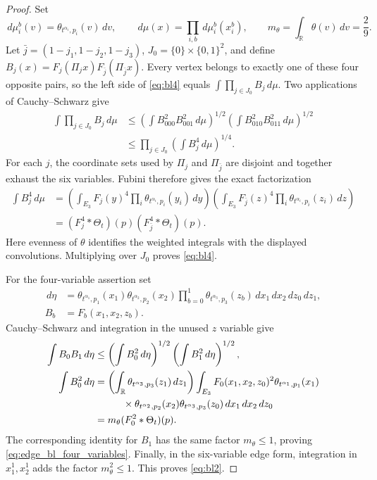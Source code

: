 \documentclass[12pt,reqno]{amsart}
\theoremstyle{plain}
\theoremstyle{definition}
\theoremstyle{remark}
\numberwithin{equation}{section}
\newcommand{\R}{\mathbb R}
\newcommand{\dd}{\,d}
\begin{document}
\begin{proof}
Set
\[
 \dd\mu_i^b(v)=\theta_{t^{\alpha_i},p_i}(v)\dd v,
 \qquad \dd\mu(x)=\prod_{i,b}\dd\mu_i^b(x_i^b),\qquad
 m_\theta=\int_\R\theta(v)\dd v=\frac29.
\]
Let $\bar j=(1-j_1,1-j_2,1-j_3)$, $J_0=\{0\}\times\{0,1\}^2$,
and define $B_j(x)=F_j(\Pi_jx)F_{\bar j}(\Pi_{\bar j}x)$.
Every vertex belongs to exactly one of these four opposite pairs, so
the left side of \eqref{eq:bl4} equals $\int\prod_{j\in J_0}B_j\dd\mu$.
Two applications of Cauchy--Schwarz give
\begin{align*}
 \int\prod_{j\in J_0}B_j\dd\mu
 &\le\left(\int B_{000}^2B_{001}^2\dd\mu\right)^{1/2}
       \left(\int B_{010}^2B_{011}^2\dd\mu\right)^{1/2}\\
 &\le\prod_{j\in J_0}\left(\int B_j^4\dd\mu\right)^{1/4}.
\end{align*}
For each $j$, the coordinate sets used by $\Pi_j$ and $\Pi_{\bar j}$
are disjoint and together exhaust the six variables. Fubini therefore
gives the exact factorization
\begin{align*}
 \int B_j^4\dd\mu
 &=\left(\int_{E_3}F_j(y)^4
                    \prod_i\theta_{t^{\alpha_i},p_i}(y_i)\dd y\right)
   \left(\int_{E_3}F_{\bar j}(z)^4
                    \prod_i\theta_{t^{\alpha_i},p_i}(z_i)\dd z\right)\\
 &=(F_j^4*\Theta_t)(p)(F_{\bar j}^4*\Theta_t)(p).
\end{align*}
Here evenness of $\theta$ identifies the weighted integrals with
the displayed convolutions. Multiplying over $J_0$ proves
\eqref{eq:bl4}.

For the four-variable assertion set
\begin{align*}
 \dd\eta&=\theta_{t^{\alpha_1},p_1}(x_1)
          \theta_{t^{\alpha_2},p_2}(x_2)
          \prod_{b=0}^1\theta_{t^{\alpha_3},p_3}(z_b)
          \dd x_1\dd x_2\dd z_0\dd z_1,\\
 B_b&=F_b(x_1,x_2,z_b).
\end{align*}
Cauchy--Schwarz and integration in the unused $z$ variable give
\begin{align*}
 \int B_0B_1\dd\eta
 &\le\left(\int B_0^2\dd\eta\right)^{1/2}
       \left(\int B_1^2\dd\eta\right)^{1/2},\\
 \int B_0^2\dd\eta
 &=\left(\int_\R\theta_{t^{\alpha_3},p_3}(z_1)\dd z_1\right)
   \int_{E_3}F_0(x_1,x_2,z_0)^2
       \theta_{t^{\alpha_1},p_1}(x_1)\\
 &\hspace{10mm}\times
       \theta_{t^{\alpha_2},p_2}(x_2)
       \theta_{t^{\alpha_3},p_3}(z_0)\dd x_1\dd x_2\dd z_0\\
 &=m_\theta(F_0^2*\Theta_t)(p).
\end{align*}
The corresponding identity for $B_1$ has the same factor
$m_\theta\le1$, proving \eqref{eq:edge_bl_four_variables}.
Finally, in the six-variable edge form, integration in $x_1^1,x_2^1$
adds the factor $m_\theta^2\le1$. This proves \eqref{eq:bl2}.
\end{proof}
\end{document}
